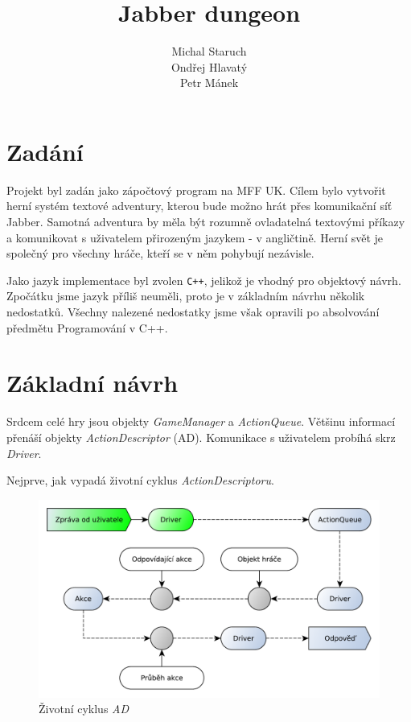 \documentclass[11pt, a4paper]{article}
\title{\textbf{Jabber dungeon}}
\author{Michal Staruch\\
		Ondřej Hlavatý\\
		Petr Mánek}
\date{}
\def\class#1{\emph{#1}}
\begin{document}
\maketitle

\section{Zadání}

Projekt byl zadán jako zápočtový program na MFF UK. Cílem bylo vytvořit herní systém textové adventury, kterou bude možno hrát přes komunikační síť Jabber. Samotná adventura by měla být rozumně ovladatelná textovými příkazy a komunikovat s uživatelem přirozeným jazykem - v angličtině. Herní svět je společný pro všechny hráče, kteří se v něm pohybují nezávisle.

Jako jazyk implementace byl zvolen \texttt{C++}, jelikož je vhodný pro objektový návrh. Zpočátku jsme jazyk příliš neuměli, proto je v základním návrhu několik nedostatků. Všechny nalezené nedostatky jsme však opravili po absolvování předmětu Programování v C++.

\section{Základní návrh}

Srdcem celé hry jsou objekty \class{GameManager} a \class{ActionQueue}. Většinu informací přenáší objekty \class{ActionDescriptor} (AD). Komunikace s uživatelem probíhá skrz \class{Driver}.

Nejprve, jak vypadá životní cyklus \class{ActionDescriptoru}.
\begin{figure}[htp]
\centering
\includegraphics[scale=0.6]{AD-lifecycle.pdf}
\caption{Životní cyklus \class{AD}}
\label{ad-lifecycle}
\end{figure}
\end{document}
